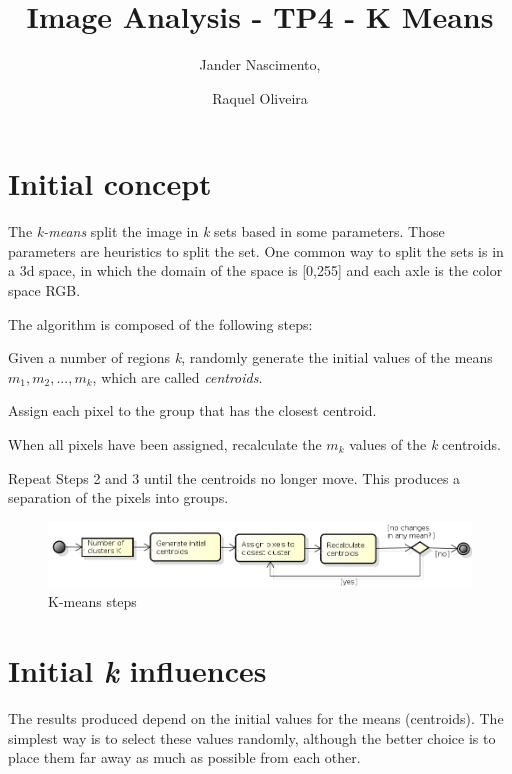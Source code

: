 \documentclass{article}
\newcounter{qcounter}
\begin{document}
\title{Image Analysis - TP4 - K Means}

\author{Jander Nascimento, 
\and Raquel Oliveira}

\maketitle

\section{Initial concept}

The \emph{k-means} split the image in \emph{k} sets based in some parameters. Those parameters are heuristics to split the set. One common way to split the sets is in a 3d space, in which the domain of the space is [0,255] and each axle is the color space RGB. 

The algorithm is composed of the following steps:
\begin{list}{:~}{}
\item Given a number of regions \emph{k}, randomly generate the initial values of the means $m_1, m_2, ..., m_k$, which are called \emph{centroids}.
\item Assign each pixel to the group that has the closest centroid.
\item When all pixels have been assigned, recalculate the $m_k$ values of the \emph{k} centroids.
\item Repeat Steps 2 and 3 until the centroids no longer move. This produces a separation of the pixels into groups.
\end{list}

\begin{figure}[H]
\centering
\includegraphics[width=1.0\textwidth]{../image/ActivityDiagram.png}
\caption{K-means steps}
\label{fig:kmeans}
\end{figure}

\section{Initial \emph{k} influences}

The results produced depend on the initial values for the means (centroids). The simplest way is to select these values randomly, although the better choice is to place them far away as much as possible from each other.
\end{document}
